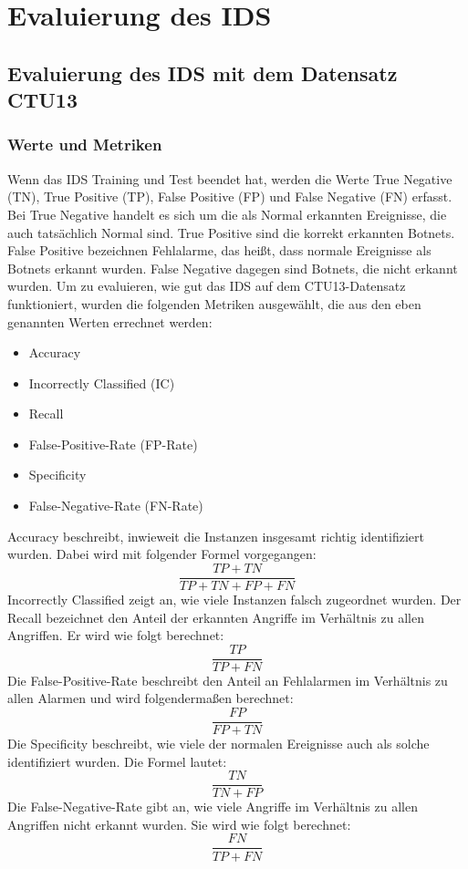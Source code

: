 \documentclass[main.tex]{subfiles}
\begin{document}
\section{Evaluierung des IDS}
\subsection{Evaluierung des IDS mit dem Datensatz CTU13}

\subsubsection{Werte und Metriken}
Wenn das IDS Training und Test beendet hat, werden die Werte True Negative (TN), True Positive (TP), False Positive (FP) und False Negative (FN) erfasst. Bei True Negative handelt es sich um die als Normal erkannten Ereignisse, die auch tatsächlich Normal sind. True Positive sind die korrekt erkannten Botnets. False Positive bezeichnen Fehlalarme, das heißt, dass normale Ereignisse als Botnets erkannt wurden. False Negative dagegen sind Botnets, die nicht erkannt wurden. 
Um zu evaluieren, wie gut das IDS auf dem CTU13-Datensatz funktioniert, wurden die folgenden Metriken ausgewählt, die aus den eben genannten Werten errechnet werden:

\begin{itemize}
\item Accuracy
\item Incorrectly Classified (IC)
\item Recall
\item False-Positive-Rate (FP-Rate)
\item Specificity
\item False-Negative-Rate (FN-Rate)
\end{itemize}

Accuracy beschreibt, inwieweit die Instanzen insgesamt richtig identifiziert wurden. Dabei wird mit folgender Formel vorgegangen:
\begin{equation}
\frac{TP + TN}{TP + TN + FP + FN}
\end{equation}
Incorrectly Classified zeigt an, wie viele Instanzen falsch zugeordnet wurden.
Der Recall bezeichnet den Anteil der erkannten Angriffe im Verhältnis zu allen Angriffen. Er wird wie folgt berechnet:
\begin{equation}
\frac{TP}{TP +  FN}
\end{equation}
Die False-Positive-Rate beschreibt den Anteil an Fehlalarmen im Verhältnis zu allen Alarmen und wird folgendermaßen berechnet:
\begin{equation}
\frac{FP}{FP + TN}
\end{equation}
Die Specificity beschreibt, wie viele der normalen Ereignisse auch als solche identifiziert wurden. Die Formel lautet:
\begin{equation}
\frac{TN}{TN + FP}
\end{equation}
Die False-Negative-Rate gibt an, wie viele Angriffe im Verhältnis zu allen Angriffen nicht erkannt wurden. Sie wird wie folgt berechnet:
\begin{equation}
\frac{FN}{TP + FN}
\end{equation}
\end{document}
